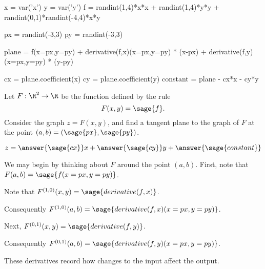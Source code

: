 \documentclass{ximera}
\author{Jim Fowler}
\begin{document}
\makerandom

\begin{sagesilent}
x = var('x')
y = var('y')
f = randint(1,4)*x*x + randint(1,4)*y*y + randint(0,1)*randint(-4,4)*x*y

px = randint(-3,3)
py = randint(-3,3)

plane = f(x=px,y=py) + derivative(f,x)(x=px,y=py) * (x-px) +   derivative(f,y)(x=px,y=py) * (y-py)

cx = plane.coefficient(x)
cy = plane.coefficient(y)
constant = plane - cx*x - cy*y
  
\end{sagesilent}

\begin{exercise}

  Let $F : \R^2 \to \R$ be the function defined by the rule
  \[
    F(x,y) = \sage{f}.
  \]
  Consider the graph $z = F(x,y)$, and find a tangent plane to the
  graph of $F$ at the point $(a,b) = (\sage{px},\sage{py})$.

  \begin{prompt}
    \[
      z = \answer{\sage{cx}} x + \answer{\sage{cy}} y + \answer{\sage{constant}}
    \]
  \end{prompt}

  \begin{hint}
    We may begin by thinking about $F$ around the point $(a,b)$.  First, note that $F(a,b) = \sage{f(x=px,y=py)}$.
  \end{hint}

  \begin{hint}
    Note that $F^{(1,0)}(x,y) = \sage{derivative(f,x)}$.
  \end{hint}

  \begin{hint}
    Consequently $F^{(1,0)}(a,b) = \sage{derivative(f,x)(x=px,y=py)}$.
  \end{hint}  

  \begin{hint}
    Next, $F^{(0,1)}(x,y) = \sage{derivative(f,y)}$.
  \end{hint}

  \begin{hint}
    Consequently $F^{(0,1)}(a,b) = \sage{derivative(f,y)(x=px,y=py)}$.
  \end{hint}

  \begin{hint}
    These derivatives record how changes to the input affect the output.
  \end{hint}


\end{exercise}
\end{document}
